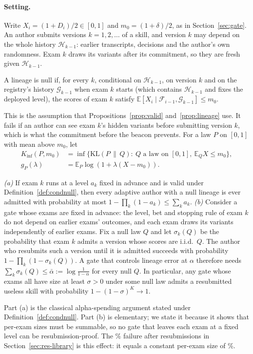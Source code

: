 \paragraph{Setting.} Write $X_i=(1+D_i)/2\in[0,1]$ and $m_0=(1+\delta)/2$, as in Section~\ref{sec:gate}. An author submits versions $k=1,2,\dots$ of a skill, and version $k$ may depend on the whole history $\mathcal H_{k-1}$: earlier transcripts, decisions and the author's own randomness. Exam $k$ draws its variants after its commitment, so they are fresh given $\mathcal H_{k-1}$.
\begin{definition}\label{def:condnull}
A lineage is null if, for every $k$, conditional on $\mathcal H_{k-1}$, on version $k$ and on the registry's history $\mathcal G_{k-1}$ when exam $k$ starts (which contains $\mathcal H_{k-1}$ and fixes the deployed level), the scores of exam $k$ satisfy $\mathbb E[X_i\mid\mathcal F_{i-1},\mathcal G_{k-1}]\le m_0$.
\end{definition}
This is the assumption that Propositions~\ref{prop:valid} and~\ref{prop:lineage} use. It fails if an author can see exam $k$'s hidden variants before submitting version $k$, which is what the commitment before the beacon prevents. For a law $P$ on $[0,1]$ with mean above $m_0$, let
\begin{align*}
K_{\inf}(P,m_0)&=\inf\{\mathrm{KL}(P\,\|\,Q):\ Q \text{ a law on }[0,1],\ \mathbb E_QX\le m_0\},\\
g_P(\lambda)&=\mathbb E_P\log(1+\lambda(X-m_0)).
\end{align*}

\begin{proposition}\label{thm:lineage}
\emph{(a)} If exam $k$ runs at a level $a_k$ fixed in advance and is valid under Definition~\ref{def:condnull}, then every adaptive author with a null lineage is ever admitted with probability at most $1-\prod_k(1-a_k)\le\sum_ka_k$.
\emph{(b)} Consider a gate whose exams are fixed in advance: the level, bet and stopping rule of exam $k$ do not depend on earlier exams' outcomes, and each exam draws its variants independently of earlier exams. Fix a null law $Q$ and let $\sigma_k(Q)$ be the probability that exam $k$ admits a version whose scores are i.i.d.\ $Q$. The author who resubmits such a version until it is admitted succeeds with probability $1-\prod_k(1-\sigma_k(Q))$. A gate that controls lineage error at $\alpha$ therefore needs $\sum_k\sigma_k(Q)\le\bar\alpha:=\log\frac{1}{1-\alpha}$ for every null $Q$. In particular, any gate whose exams all have size at least $\sigma>0$ under some null law admits a resubmitted useless skill with probability $1-(1-\sigma)^K\to1$.
\end{proposition}
Part (a) is the classical alpha-spending argument \citep{tian2021online} stated under Definition~\ref{def:condnull}. Part (b) is elementary; we state it because it shows that per-exam sizes must be summable, so no gate that leaves each exam at a fixed level can be resubmission-proof. The \NResubPerExam\% failure after \PResub{} resubmissions in Section~\ref{sec:res-library} is this effect: it equals a constant per-exam size of \NResubImpliedSize\%.

